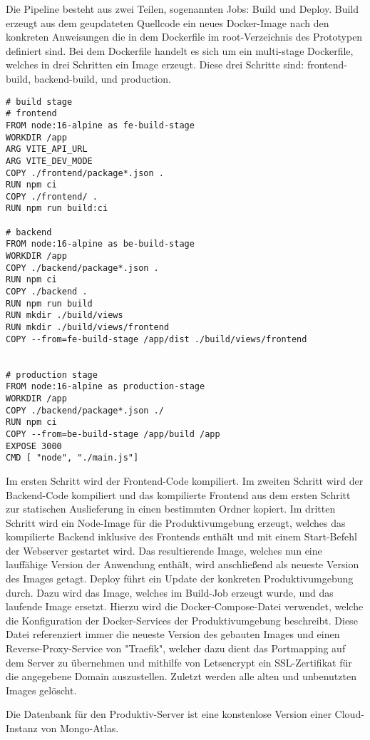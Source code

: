 Die Pipeline besteht aus zwei Teilen, sogenannten Jobs: Build und Deploy.
Build erzeugt aus dem geupdateten Quellcode ein neues Docker-Image nach den konkreten Anweisungen die in dem Dockerfile im root-Verzeichnis des Prototypen definiert sind. Bei dem Dockerfile handelt es sich um ein multi-stage Dockerfile, welches in drei Schritten ein Image erzeugt. Diese drei Schritte sind:
frontend-build, backend-build, und production.

\begin{lstlisting}[caption=Dockerfile zum Bauen des Images]
# build stage
# frontend
FROM node:16-alpine as fe-build-stage
WORKDIR /app
ARG VITE_API_URL
ARG VITE_DEV_MODE
COPY ./frontend/package*.json .
RUN npm ci
COPY ./frontend/ .
RUN npm run build:ci

# backend
FROM node:16-alpine as be-build-stage
WORKDIR /app
COPY ./backend/package*.json .
RUN npm ci
COPY ./backend .
RUN npm run build
RUN mkdir ./build/views
RUN mkdir ./build/views/frontend
COPY --from=fe-build-stage /app/dist ./build/views/frontend


# production stage
FROM node:16-alpine as production-stage
WORKDIR /app
COPY ./backend/package*.json ./
RUN npm ci
COPY --from=be-build-stage /app/build /app
EXPOSE 3000
CMD [ "node", "./main.js"]
\end{lstlisting}

Im ersten Schritt wird der Frontend-Code kompiliert. Im zweiten Schritt wird der Backend-Code kompiliert und das kompilierte Frontend aus dem ersten Schritt zur statischen Auslieferung in einen bestimmten Ordner kopiert. Im dritten Schritt wird ein Node-Image für die Produktivumgebung erzeugt, welches das kompilierte Backend inklusive des Frontends enthält und mit einem Start-Befehl der Webserver gestartet wird.
Das resultierende Image, welches nun eine lauffähige Version der Anwendung enthält, wird anschließend als neueste Version des Images getagt.
Deploy führt ein Update der konkreten Produktivumgebung durch. Dazu wird das Image, welches im Build-Job erzeugt wurde, und das laufende Image ersetzt. Hierzu wird die Docker-Compose-Datei verwendet, welche die Konfiguration der Docker-Services der Produktivumgebung beschreibt. Diese Datei referenziert immer die neueste Version des gebauten Images und einen Reverse-Proxy-Service von "Traefik", welcher dazu dient das Portmapping auf dem Server zu übernehmen und mithilfe von Letsencrypt ein SSL-Zertifikat für die angegebene Domain auszustellen.
Zuletzt werden alle alten und unbenutzten Images gelöscht.

Die Datenbank für den Produktiv-Server ist eine konstenlose Version einer Cloud-Instanz von Mongo-Atlas.